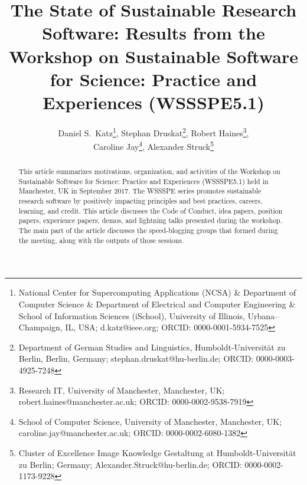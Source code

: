 \documentclass[11pt,letterpaper]{article}
\begin{document}
\title{The State of Sustainable Research Software:
Results from the Workshop on Sustainable Software for Science: Practice
and Experiences (WSSSPE5.1)}
\author{Daniel S.~Katz\thanks{National Center for Supercomputing Applications (NCSA) \& Department of Computer Science  \& Department of Electrical and Computer Engineering  \& School of Information Sciences (iSchool), University of Illinois, Urbana--Champaign, IL, USA; d.katz@ieee.org; ORCID: 0000-0001-5934-7525},
Stephan Druskat\thanks{Department of German Studies and Linguistics, Humboldt-Universität zu Berlin, Berlin, Germany; stephan.druskat@hu-berlin.de; ORCID: 0000-0003-4925-7248},
Robert Haines\thanks{Research IT, University of Manchester, Manchester, UK; robert.haines@manchester.ac.uk; ORCID: 0000-0002-9538-7919},\\
Caroline Jay\thanks{School of Computer Science, University of Manchester, Manchester, UK; caroline.jay@manchester.ac.uk; ORCID: 0000-0002-6080-1382},
Alexander Struck\thanks{Cluster of Excellence Image Knowledge Gestaltung at Humboldt-Universität zu Berlin; Germany; Alexander.Struck@hu-berlin.de; ORCID: 0000-0002-1173-9228}}

\maketitle



\begin{abstract}
This article summarizes motivations, organization, and activities of the Workshop on Sustainable Software for Science: Practice and Experiences (WSSSPE5.1) held in Manchester, UK in September 2017. The WSSSPE series promotes sustainable research software by positively impacting principles and best practices, careers, learning, and credit. This article discusses the Code of Conduct, idea papers, position papers, experience papers, demos, and lightning talks presented during the workshop. The main part of the article discusses the speed-blogging groups that formed during the meeting, along with the outputs of those sessions. %


\end{abstract}
\end{document}
